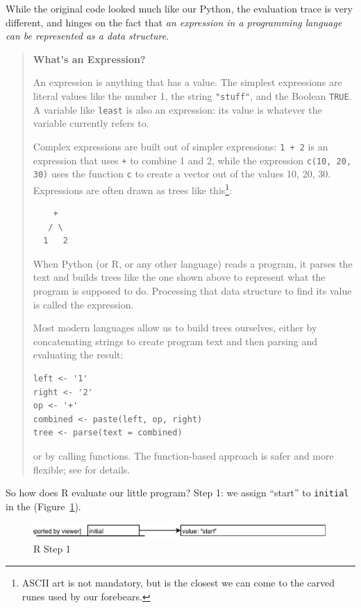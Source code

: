 While the original code looked much like our Python,
the evaluation trace is very different,
and hinges on the fact that
\emph{an expression in a programming language can be represented as a data structure}.

\begin{quote}
\textbf{What's an Expression?}

An expression is anything that has a value.
The simplest expressions are literal values like the number 1,
the string \texttt{"stuff"}, and the Boolean \texttt{TRUE}.
A variable like \texttt{least} is also an expression:
its value is whatever the variable currently refers to.

Complex expressions are built out of simpler expressions:
\texttt{1 + 2} is an expression that uses \texttt{+} to combine 1 and 2,
while the expression \texttt{c(10, 20, 30)} uses the function \texttt{c}
to create a vector out of the values 10, 20, 30.
Expressions are often drawn as trees like this\footnote{
  ASCII art is not mandatory,
  but is the closest we can come to the carved runes used by our forebears.}:

\begin{lstlisting}
    +
   / \
  1   2
\end{lstlisting}

When Python (or R, or any other language) reads a program,
it parses the text and builds trees like the one shown above
to represent what the program is supposed to do.
Processing that data structure to find its value
is called  the expression.

Most modern languages allow us to build trees ourselves,
either by concatenating strings to create program text
and then parsing and evaluating the result:

\begin{lstlisting}
left <- '1'
right <- '2'
op <- '+'
combined <- paste(left, op, right)
tree <- parse(text = combined)
\end{lstlisting}

\noindent
or by calling functions.
The function-based approach is safer and more flexible;
see \citet{Wick2019} for details.
\end{quote}

So how does R evaluate our little program?
Step 1: we assign ``start'' to \texttt{initial} in the 
(Figure~\ref{fig:r-step-1}).

\begin{figure}[h]
  \includegraphics{figures/nse/r-step-01.pdf}
  \caption{R Step 1}
  \label{fig:r-step-1}
\end{figure}

